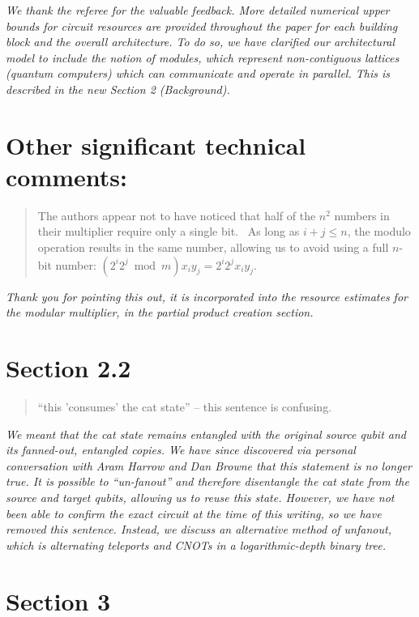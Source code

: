 \documentclass{article}
\theoremstyle{plain} \newtheorem{lemma}{Lemma}
\begin{document}
{\it We thank the referee for the valuable feedback. More detailed numerical
upper bounds for circuit resources are provided throughout the paper for each
building block and the overall architecture. To do so, we have clarified our architectural
model to include the notion of \emph{modules}, which represent non-contiguous
lattices (quantum computers) which can communicate and operate in parallel.
This is described in the new Section 2 (Background).
}

\section{Other significant technical comments:}

\begin{quote}
The authors appear not to have noticed that half of the $n^2$ numbers in
their multiplier require only a single bit.  As long as $i+j \le n$, the
modulo operation results in the same number, allowing us to avoid
using a full $n$-bit number: $(2^i 2^j \bmod m) x_i y_j = 2^i 2^j x_i y_j$.
\end{quote}

{\it Thank you for pointing this out, it is incorporated into the resource estimates for
the modular multiplier, in the partial product creation section.}

\section{Section 2.2}

\begin{quote}
``this 'consumes' the cat state'' -- this sentence is confusing.
\end{quote}

{\it We meant that the cat state remains entangled with the original source
qubit and its fanned-out, entangled copies. We have since discovered
via personal conversation with Aram Harrow and Dan Browne that this
statement is no longer true. It is possible to ``un-fanout'' and therefore
disentangle the cat state from the source and target qubits, allowing us
to reuse this state.  However, we have not been able to confirm the
exact circuit at the time of this writing, so we have removed this sentence.
Instead, we discuss an alternative method of unfanout, which is alternating
teleports and CNOTs in a logarithmic-depth binary tree.}

\section{Section 3}
\end{document}
